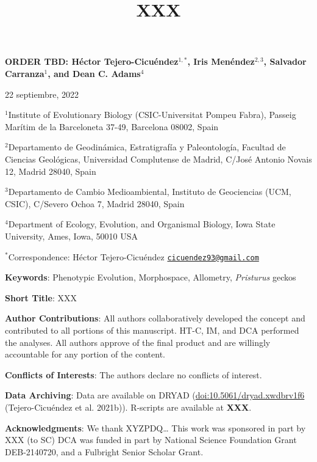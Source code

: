 \documentclass[
]{article}
\title{XXX}
\author{}
\date{\vspace{-2.5em}}
\begin{document}
\maketitle

\begin{center}
\textbf{ORDER TBD:  H{\'{e}}ctor Tejero-Cicu{\'{e}}ndez$^{1,*}$,  Iris Men{\'{e}}ndez$^{2,3}$, Salvador Carranza$^{1}$, and Dean C. Adams$^{4}$} 
\end{center}

\begin{center}22 septiembre, 2022\end{center}

\(^{1}\)Institute of Evolutionary Biology (CSIC-Universitat Pompeu
Fabra), Passeig Marítim de la Barceloneta 37-49, Barcelona 08002, Spain

\(^{2}\)Departamento de Geodinámica, Estratigrafía y Paleontología,
Facultad de Ciencias Geológicas, Universidad Complutense de Madrid,
C/José Antonio Novais 12, Madrid 28040, Spain

\(^{3}\)Departamento de Cambio Medioambiental, Instituto de Geociencias
(UCM, CSIC), C/Severo Ochoa 7, Madrid 28040, Spain

\(^{4}\)Department of Ecology, Evolution, and Organismal Biology, Iowa
State University, Ames, Iowa, 50010 USA

\(^{*}\)Correspondence: Héctor Tejero-Cicuéndez
\href{mailto:cicuendez93@gmail.com}{\nolinkurl{cicuendez93@gmail.com}}

\hfill\break

\textbf{Keywords}: Phenotypic Evolution, Morphospace, Allometry,
\emph{Pristurus} geckos \hfill\break

\textbf{Short Title}: XXX \hfill\break

\textbf{Author Contributions}: All authors collaboratively developed the
concept and contributed to all portions of this manuscript. HT-C, IM,
and DCA performed the analyses. All authors approve of the final product
and are willingly accountable for any portion of the
content.\hfill\break

\textbf{Conflicts of Interests}: The authors declare no conflicts of
interest.\hfill\break

\textbf{Data Archiving}: Data are available on DRYAD
(\url{doi:10.5061/dryad.xwdbrv1f6} (Tejero-Cicuéndez et al. 2021b)).
R-scripts are available at \textbf{XXX}. \hfill\break

\textbf{Acknowledgments}: We thank XYZPDQ\ldots{} This work was
sponsored in part by XXX (to SC) DCA was funded in part by National
Science Foundation Grant DEB-2140720, and a Fulbright Senior Scholar
Grant.
\end{document}
